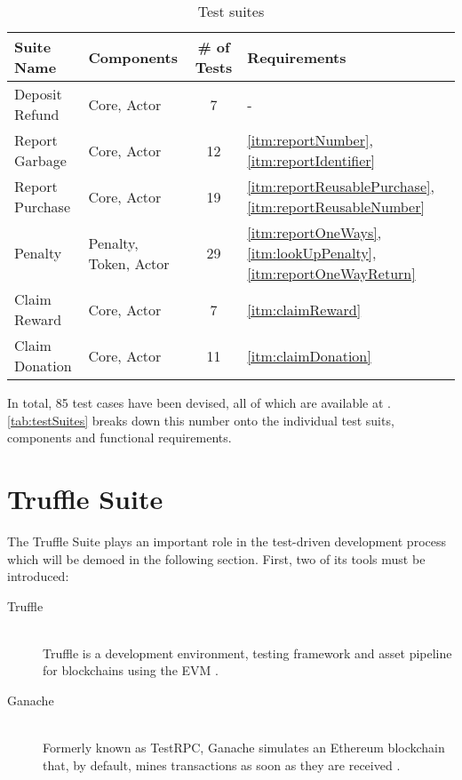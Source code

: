 \begin{table}[hbt]
	\centering
  	\begin{tabular}{l|l|c|l}
	    Suite Name & Components & \# of Tests & Requirements \\
	    \hline
	    Deposit Refund & Core, Actor & 7 & - \\
	    Report Garbage & Core, Actor & 12 & \ref{itm:reportNumber}, \ref{itm:reportIdentifier} \\
	    Report Purchase & Core, Actor & 19 & \ref{itm:reportReusablePurchase}, \ref{itm:reportReusableNumber} \\
		Penalty & Penalty, Token, Actor & 29 & \ref{itm:reportOneWays}, \ref{itm:lookUpPenalty}, \ref{itm:reportOneWayReturn} \\ 
		Claim Reward & Core, Actor & 7 & \ref{itm:claimReward} \\
		Claim Donation & Core, Actor & 11 & \ref{itm:claimDonation} \\
  	\end{tabular}
  	\caption{Test suites}
  	\label{tab:testSuites}
\end{table}

\FloatBarrier

In total, 85 test cases have been devised, all of which are available at \cite{depositRefundGitHub}. \autoref{tab:testSuites} breaks down this number onto the individual test suits, components and functional requirements.

\pagebreak

\section{Truffle Suite}
The Truffle Suite plays an important role in the test-driven development process which will be demoed in the following section. First, two of its tools must be introduced:

\begin{description}
  \item[Truffle]
  \hfill \\
  Truffle is a development environment, testing framework and asset pipeline for blockchains using the \ac{EVM} \cite[Truffle Overview]{truffleSuite}.
  \item[Ganache]
  \hfill \\
  Formerly known as TestRPC, Ganache simulates an Ethereum blockchain that, by default, mines transactions as soon as they are received \cite[Ganache Quickstart]{truffleSuite}. 
\end{description}

